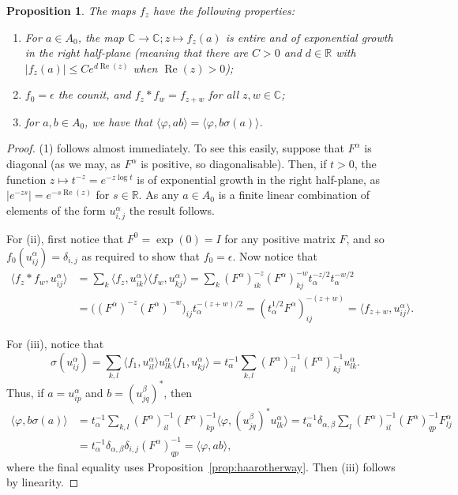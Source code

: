 \documentclass[twoside,a4paper,12pt]{article}
\theoremstyle{plain}
\newtheorem{proposition}{Proposition}[section]
\theoremstyle{definition}
\newcommand{\ip}[2]{\langle #1,#2 \rangle}
\newcommand{\re}{\operatorname{Re}}
\begin{document}
\begin{proposition}\label{prop:firstpropsfz}
The maps $f_z$ have the following properties:
\begin{enumerate}
\item For $a\in A_0$, the map $\mathbb C\rightarrow\mathbb C;
z\mapsto f_z(a)$ is entire and of exponential growth in the right half-plane
(meaning that there are $C>0$ and $d\in\mathbb R$ with $|f_z(a)| \leq
C e^{d\re(z)}$ when $\re(z)>0$);
\item $f_0=\epsilon$ the counit, and $f_z * f_w = f_{z+w}$ for all
$z,w\in\mathbb C$;
\item for $a,b\in A_0$, we have that $\ip{\varphi}{ab}
= \ip{\varphi}{b\sigma(a)}$.
\end{enumerate}
\end{proposition}
\begin{proof}
(1) follows almost immediately.  To see this easily, suppose that $F^\alpha$
is diagonal (as we may, as $F^\alpha$ is positive, so diagonalisable).
Then, if $t>0$, the function $z\mapsto t^{-z} = e^{-z\log t}$ is of
exponential growth in the right half-plane, as $|e^{-zs}| = e^{-s\re(z)}$ for
$s\in\mathbb R$.  As any $a\in A_0$ is a finite linear combination of
elements of the form $u^\alpha_{i,j}$ the result follows.

For (ii), first notice that $F^0 = \exp(0) = I$ for any positive matrix $F$,
and so $f_0(u^\alpha_{ij}) = \delta_{i,j}$ as required to show that
$f_0 = \epsilon$.  Now notice that
\begin{align*} \ip{f_z*f_w}{u^\alpha_{ij}}
&= \sum_k \ip{f_z}{u^\alpha_{ik}} \ip{f_w}{u^\alpha_{kj}}
= \sum_k (F^\alpha)^{-z}_{ik}(F^\alpha)^{-w}_{kj}
   t_\alpha^{-z/2} t_\alpha^{-w/2} \\
&= \big( (F^\alpha)^{-z} (F^\alpha)^{-w} \big)_{ij} t_\alpha^{-(z+w)/2}
= (t_\alpha^{1/2} F^\alpha)^{-(z+w)}_{ij}
= \ip{f_{z+w}}{u^\alpha_{ij}}. \end{align*}

For (iii), notice that
\[ \sigma(u^\alpha_{ij}) = \sum_{k,l} \ip{f_1}{u^\alpha_{il}}
u^\alpha_{lk} \ip{f_1}{u^\alpha_{kj}}
= t_\alpha^{-1} \sum_{k,l} (F^\alpha)^{-1}_{il} (F^\alpha)^{-1}_{kj}
u^\alpha_{lk}. \]
Thus, if $a=u^\alpha_{ip}$ and $b=(u^\beta_{jq})^*$, then
\begin{align*} \ip{\varphi}{b \sigma(a)}
&= t_\alpha^{-1} \sum_{k,l} (F^\alpha)^{-1}_{il} (F^\alpha)^{-1}_{kp}
   \ip{\varphi}{(u^\beta_{jq})^*u^\alpha_{lk}}
= t_\alpha^{-1} \delta_{\alpha,\beta} \sum_{l} (F^\alpha)^{-1}_{il}
   (F^\alpha)^{-1}_{qp} F^\alpha_{lj} \\
&= t_\alpha^{-1} \delta_{\alpha,\beta} \delta_{i,j} (F^\alpha)^{-1}_{qp}
= \ip{\varphi}{ab},
\end{align*}
where the final equality uses Proposition~\ref{prop:haarotherway}.
Then (iii) follows by linearity.
\end{proof}
\end{document}
